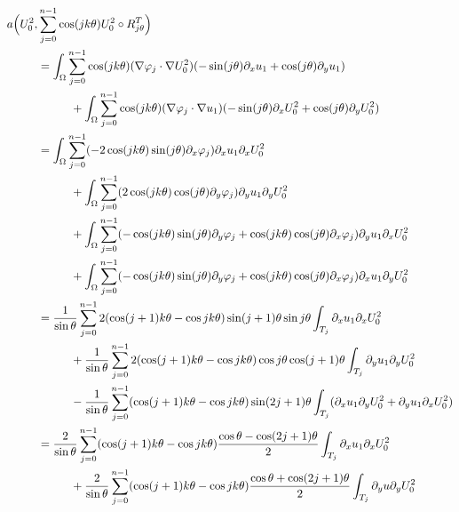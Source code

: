 \documentclass[JEP,XML,SOM,Unicode,ThmDefs,NoFloatCountersInSection,published]{cedram}
\theoremstyle{plain}
\theoremstyle{definition}
\begin{document}
\vspace*{-1\baselineskip}
\bgroup\smaller
\begin{align*}
a\Bigl(U_0^2,&\sum_{j=0}^{n-1} \cos(jk\theta) U_0^2 \circ R_{j\theta}^T\Bigr) \\
&= \int_\Omega \sum_{j=0}^{n-1} \cos(jk\theta)(\nabla \varphi_j\cdot \nabla U_0^2)(-\sin(j\theta) \partial_x u_1+\cos (j\theta)\partial_y u_1) \\
&\hspace*{1cm}+ \int_\Omega \sum_{j=0}^{n-1}\cos(jk\theta) (\nabla \varphi_j\cdot \nabla u_1)(-\sin(j\theta) \partial_x U_0^2 +\cos(j\theta) \partial_y U_0^2) \\
&= \int_\Omega \sum_{j=0}^{n-1} (-2 \cos(jk\theta)\sin(j\theta)\partial_x \varphi_j) \partial_x u_1 \partial_x U_0^2 \\
&\hspace*{1cm}+ \int_\Omega \sum_{j=0}^{n-1}(2\cos(jk\theta)\cos(j\theta)\partial_y \varphi_j) \partial_y u_1 \partial_y U_0^2 \\
&\hspace*{1cm}+ \int_\Omega \sum_{j=0}^{n-1} (-\cos(jk\theta)\sin(j\theta)\partial_y \varphi_j+\cos(jk\theta)\cos(j\theta)\partial_x \varphi_j) \partial_y u_1 \partial_x U_0^2 \\
&\hspace*{1cm}+ \int_\Omega \sum_{j=0}^{n-1} (-\cos(jk\theta)\sin(j\theta)\partial_y \varphi_j+\cos(jk\theta)\cos(j\theta)\partial_x \varphi_j) \partial_x u_1 \partial_y U_0^2\\
&=\frac{1}{\sin \theta}\sum_{j=0}^{n-1}2 (\cos(j+1)k\theta-\cos jk\theta)\sin(j+1)\theta\sin j\theta \int_{T_j} \partial_x u_1 \partial_x U_0^2\\
&\hspace*{1cm}+\frac{1}{\sin \theta}\sum_{j=0}^{n-1} 2(\cos(j+1)k\theta-\cos jk\theta)\cos j \theta\cos (j+1)\theta \int_{T_j} \partial_y u_1 \partial_y U_0^2\\
&\hspace*{1cm}-\frac{1}{\sin \theta}\sum_{j=0}^{n-1} (\cos(j+1)k\theta-\cos jk\theta)\sin(2j+1)\theta
\int_{T_j} (\partial_x u_1 \partial_y U_0^2 + \partial_y u_1 \partial_x U_0^2)\\
&=
\frac{2}{\sin \theta}\sum_{j=0}^{n-1} (\cos(j+1)k\theta - \cos jk\theta) \frac{\cos \theta-\cos(2j+1)\theta}{2} \int_{T_j}\partial_x u_1 \partial_x U_0^2\\
&\hspace*{1cm}+
\frac{2}{\sin \theta}\sum_{j=0}^{n-1} (\cos(j+1)k\theta - \cos jk\theta) \frac{\cos \theta+\cos(2j+1)\theta}{2} \int_{T_j}\partial_y u \partial_y U_0^2\\

\end{align*}
\end{document}
